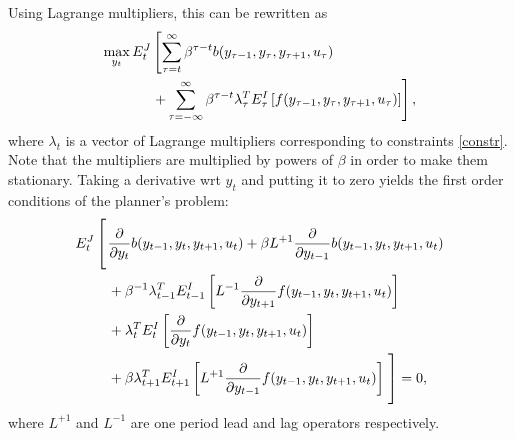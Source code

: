 \documentclass[10pt]{article}
\begin{document}
Using Lagrange multipliers, this can be rewritten as
\begin{align}
\max_{y_t}E_t^J&\left[\sum_{\tau=t}^\infty\beta^{\tau-t}b(y_{\tau-1},y_\tau,y_{\tau+1},u_\tau)\right.\notag\\
&\left.+\sum_{\tau=-\infty}^{\infty}\beta^{\tau-t}\lambda^T_\tau E_\tau^I\left[f(y_{\tau-1},y_\tau,y_{\tau+1},u_\tau)\right]\right],
\label{planner_optim_l}
\end{align}
where $\lambda_t$ is a vector of Lagrange multipliers corresponding to
constraints \eqref{constr}. Note that the multipliers are multiplied
by powers of $\beta$ in order to make them stationary. Taking a
derivative wrt $y_t$ and putting it to zero yields the first order
conditions of the planner's problem:
\begin{align}
E^J_t\left[\vphantom{\frac{\int^(_)}{\int^(\_)}}\right.&\frac{\partial}{\partial y_t}b(y_{t-1},y_t,y_{t+1},u_t)+
\beta L^{+1}\frac{\partial}{\partial y_{t-1}}b(y_{t-1},y_t,y_{t+1},u_t)\notag\\
&+\beta^{-1}\lambda_{t-1}^TE^I_{t-1}\left[L^{-1}\frac{\partial}{\partial y_{t+1}}f(y_{t-1},y_t,y_{t+1},u_t)\right]\notag\\
&+\lambda_t^TE^I_t\left[\frac{\partial}{\partial y_{t}}f(y_{t-1},y_t,y_{t+1},u_t)\right]\notag\\
&+\beta\lambda_{t+1}^TE^I_{t+1}\left[L^{+1}\frac{\partial}{\partial y_{t-1}}f(y_{t-1},y_t,y_{t+1},u_t)\right]
\left.\vphantom{\frac{\int^(_)}{\int^(\_)}}\right]
 = 0,\label{planner_optim_foc}
\end{align}
where $L^{+1}$ and $L^{-1}$ are one period lead and lag operators respectively.
\end{document}

